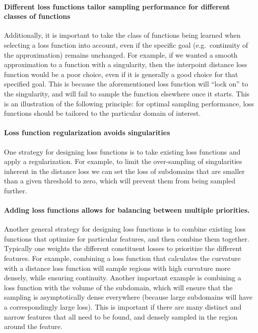 \documentclass[english, twocolumn, 10pt, aps, superscriptaddress, floatfix, prb, citeautoscript]{revtex4-1}
\begin{document}
\paragraph{Different loss functions tailor sampling performance for different classes of functions}

Additionally, it is important to take the class of functions being learned when selecting a loss function into account, even if the specific goal (e.g.~continuity of the approximation) remains unchanged.
For example, if we wanted a smooth approximation to a function with a singularity, then the interpoint distance loss function would be a poor choice, even if it is generally a good choice for that specified goal.
This is because the aforementioned loss function will ``lock on'' to the singularity, and will fail to sample the function elsewhere once it starts.
This is an illustration of the following principle: for optimal sampling performance, loss functions should be tailored to the particular domain of interest.

\paragraph{Loss function regularization avoids singularities}

One strategy for designing loss functions is to take existing loss functions and apply a regularization.
For example, to limit the over-sampling of singularities inherent in the distance loss we can set the loss of subdomains that are smaller than a given threshold to zero, which will prevent them from being sampled further.

\paragraph{Adding loss functions allows for balancing between multiple priorities.}

Another general strategy for designing loss functions is to combine existing loss functions that optimize for particular features, and then combine them together.
Typically one weights the different constituent losses to prioritize the different features.
For example, combining a loss function that calculates the curvature with a distance loss function will sample regions with high curvature more densely, while ensuring continuity.
Another important example is combining a loss function with the volume of the subdomain, which will ensure that the sampling is asymptotically dense everywhere (because large subdomains will have a correspondingly large loss).
This is important if there are many distinct and narrow features that all need to be found, and densely sampled in the region around the feature.
\end{document}
